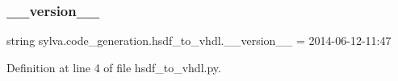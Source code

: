 \subsubsection{\texorpdfstring{\+\_\+\+\_\+version\+\_\+\+\_\+}{\_\_version\_\_}}
{\footnotesize\ttfamily string sylva.\+code\+\_\+generation.\+hsdf\+\_\+to\+\_\+vhdl.\+\_\+\+\_\+version\+\_\+\+\_\+ = \textquotesingle{}2014-\/06-\/12-\/11\+:47\textquotesingle{}\hspace{0.3cm}{\ttfamily [private]}}



Definition at line 4 of file hsdf\+\_\+to\+\_\+vhdl.\+py.

